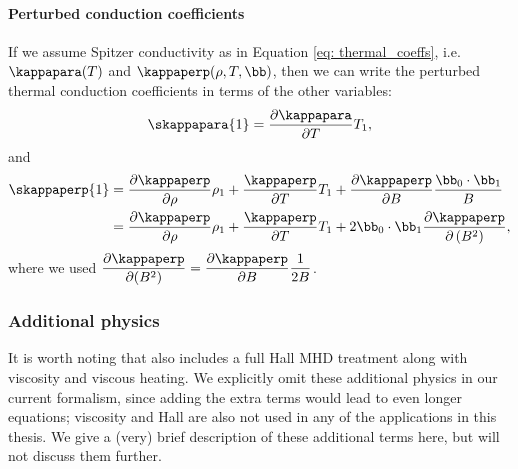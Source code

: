 \paragraph{Perturbed conduction coefficients} If we assume Spitzer conductivity as in Equation \eqref{eq: thermal_coeffs}, i.e. $\kappapara(T)$ and $\kappaperp(\rho, T, \bb)$, then we can write the perturbed thermal conduction coefficients in terms of the other variables:
\begin{equation} \label{eq: short kappapara1}
  \skappapara{1} = \frac{\partial \kappapara}{\partial T} T_1,
\end{equation}
and
\begin{equation} \label{eq: short kappaperp1}
  \begin{aligned}
    \skappaperp{1} &=
      \frac{\partial \kappaperp}{\partial \rho}\rho_1
      + \frac{\kappaperp}{\partial T}T_1
      + \frac{\partial \kappaperp}{\partial B}\frac{\bb_0 \cdot \bb_1}{B} \\
    &= \frac{\partial \kappaperp}{\partial \rho}\rho_1
      + \frac{\kappaperp}{\partial T}T_1
      + 2\bb_0\cdot\bb_1 \frac{\partial \kappaperp}{\partial\left(B^2\right)},
  \end{aligned}
\end{equation}
where we used $\dfrac{\partial \kappaperp}{\partial (B^2)} = \dfrac{\partial \kappaperp}{\partial B}\dfrac{1}{2B}$.

\subsubsection{Additional physics}
It is worth noting that {\legolas} also includes a full Hall MHD treatment along with viscosity and viscous heating. We explicitly omit these additional physics in our current formalism, since adding the extra terms would lead to even longer equations; viscosity and Hall are also not used in any of the applications in this thesis. We give a (very) brief description of these additional terms here, but will not discuss them further.

